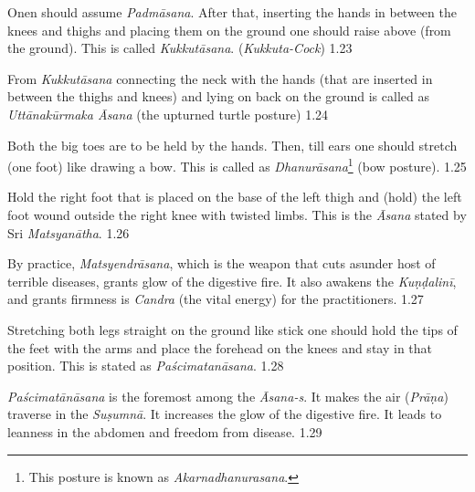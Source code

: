 
\vspace{-5pt}

Onen should assume \textit{Padmāsana}. After that, inserting the hands in between the knees and thighs and placing them on the ground one should raise above (from the ground). This is called \textit{Kukkutāsana}. (\textit{Kukkuta-Cock}) 1.23


From \textit{Kukkutāsana} connecting the neck with the hands (that are inserted in between the thighs and knees) and lying on back on the ground is called as \textit{Uttānakūrmaka Āsana} (the upturned turtle posture) 1.24


Both the big toes are to be held by the hands. Then, till ears one should stretch (one foot)  like drawing a bow. This is called as \textit{Dhanurāsana}\footnote{This posture is known as \textit{Akarnadhanurasana}.} (bow posture). 1.25


Hold the right foot that is placed on the base of the left thigh and (hold) the left foot wound outside the right knee with twisted limbs. This is the \textit{Āsana} stated by Sri \textit{Matsyanātha}. 1.26


By practice, \textit{Matsyendrāsana}, which is the weapon that cuts asunder host of terrible diseases, grants glow of the digestive fire. It also awakens the \textit{Kuṇḍalinī}, and grants firmness is \textit{Candra} (the vital energy) for the practitioners. 1.27
\medskip


Stretching both legs straight on the ground like stick one should hold the tips of the feet with the arms and place the forehead on the knees and stay in that position. This is stated as \textit{Paścimatanāsana}.  1.28



\textit{Paścimatānāsana} is the foremost among the \textit{Āsana-s}. It makes the air (\textit{Prāṇa}) traverse in the \textit{Suṣumnā}. It increases the glow of the digestive fire. It leads to leanness in the abdomen and freedom from disease.  1.29
\medskip

